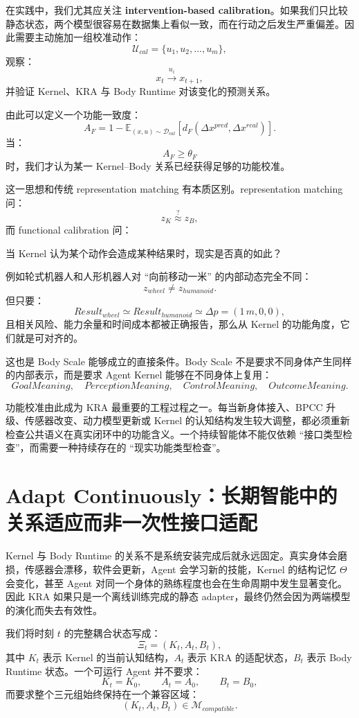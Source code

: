 在实践中，我们尤其应关注 \textbf{intervention-based calibration}。如果我们只比较静态状态，两个模型很容易在数据集上看似一致，而在行动之后发生严重偏差。因此需要主动施加一组校准动作：
\[
\mathcal U_{cal}
=
\{u_1,u_2,\ldots,u_m\},
\]
观察：
\[
x_t
\xrightarrow{u_i}
x_{t+1},
\]
并验证 Kernel、KRA 与 Body Runtime 对该变化的预测关系。

由此可以定义一个功能一致度：
\[
A_F
=
1-
\mathbb E_{(x,u)\sim\mathcal D_{cal}}
\left[
d_F(
\Delta x^{pred},
\Delta x^{real}
)
\right].
\]
当：
\[
A_F\ge\theta_F
\]
时，我们才认为某一 Kernel--Body 关系已经获得足够的功能校准。

这一思想和传统 representation matching 有本质区别。representation matching 问：
\[
z_K\stackrel{?}{\approx}z_B,
\]
而 functional calibration 问：
\begin{statementbox}
当 Kernel 认为某个动作会造成某种结果时，现实是否真的如此？
\end{statementbox}

例如轮式机器人和人形机器人对 ``向前移动一米'' 的内部动态完全不同：
\[
z_{wheel}\neq z_{humanoid}.
\]
但只要：
\[
Result_{wheel}
\simeq
Result_{humanoid}
\simeq
\Delta p=(1\,m,0,0),
\]
且相关风险、能力余量和时间成本都被正确报告，那么从 Kernel 的功能角度，它们就是可对齐的。

这也是 Body Scale 能够成立的直接条件。Body Scale 不是要求不同身体产生同样的内部表示，而是要求 Agent Kernel 能够在不同身体上复用：
\[
GoalMeaning,
\quad
PerceptionMeaning,
\quad
ControlMeaning,
\quad
OutcomeMeaning.
\]

功能校准由此成为 KRA 最重要的工程过程之一。每当新身体接入、BPCC 升级、传感器改变、动力模型更新或 Kernel 的认知结构发生较大调整，都必须重新检查公共语义在真实闭环中的功能含义。一个持续智能体不能仅依赖 ``接口类型检查''，而需要一种持续存在的 ``现实功能类型检查''。

\section{Adapt Continuously：长期智能中的关系适应而非一次性接口适配}

Kernel 与 Body Runtime 的关系不是系统安装完成后就永远固定。真实身体会磨损，传感器会漂移，软件会更新，Agent 会学习新的技能，Kernel 的结构记忆 $\Theta$ 会变化，甚至 Agent 对同一个身体的熟练程度也会在生命周期中发生显著变化。因此 KRA 如果只是一个离线训练完成的静态 adapter，最终仍然会因为两端模型的演化而失去有效性。

我们将时刻 $t$ 的完整耦合状态写成：
\[
\Xi_t
=
(K_t,A_t,B_t),
\]
其中 $K_t$ 表示 Kernel 的当前认知结构，$A_t$ 表示 KRA 的适配状态，$B_t$ 表示 Body Runtime 状态。一个可运行 Agent 并不要求：
\[
K_t=K_0,\qquad
A_t=A_0,\qquad
B_t=B_0,
\]
而要求整个三元组始终保持在一个兼容区域：
\[
\boxed{
(K_t,A_t,B_t)
\in
\mathcal M_{compatible}.
}
\]

